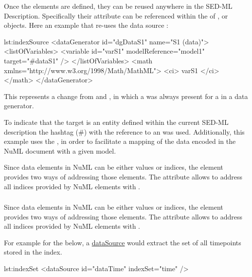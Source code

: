 Once the \SedDataSource elements are defined, they can be reused anywhere in the SED-ML Description. Specifically their  attribute can be referenced within the  of ,  or  objects. Here an example that re-uses the data source :

\begin{myXmlLst}{}{lst:indexSource}
<dataGenerator id="dgDataS1" name="S1 (data)">
	<listOfVariables>
		<variable id="varS1" modelReference="model1" target="#dataS1" />
	</listOfVariables>
	<math xmlns="http://www.w3.org/1998/Math/MathML">
		<ci> varS1 </ci>
	</math>
</dataGenerator>
\end{myXmlLst} 

This represents a change from \LoneVone and \LoneVtwo, in which a  was always present for a  in a data generator.

To indicate that the target is an entity defined within the current SED-ML description the hashtag (\#) with the reference to an  was used. Additionally, this example uses the , in order to facilitate a mapping of the data encoded in the NuML document with a given model. 

Since data elements in NuML can be either values or indices, the \SedDataSource element provides two ways of addressing those elements. The \hyperref[sec:indexSet]{} attribute allows to address all indices provided by NuML elements with . 


\subsubsection{}
\label{sec:indexSet}
Since data elements in NuML can be either values or indices, the \SedDataSource element provides two ways of addressing those elements. The  attribute allows to address all indices provided by NuML elements with . 

For example for the   below, a \hyperref[class:dataSource]{dataSource} would extract the set of all timepoints stored in the index.

\begin{myXmlLst}{}{lst:indexSet}
<dataSource id="dataTime" indexSet="time" />
\end{myXmlLst} 

